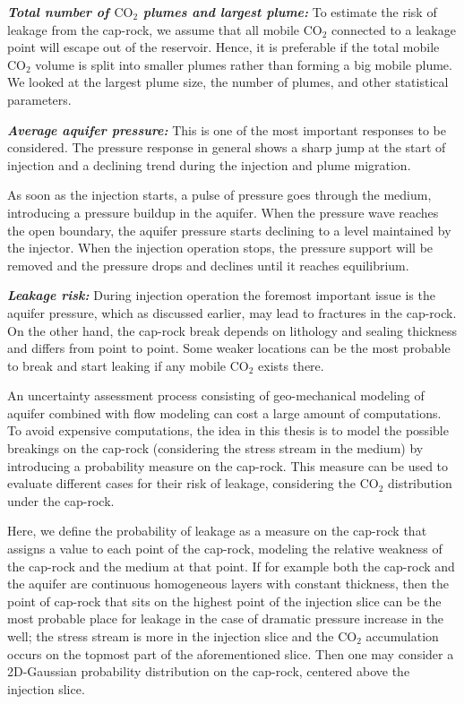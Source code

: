 \textbf{\textit{Total number of $\mbox{CO}_2$ plumes and largest plume:}} To
estimate the risk of leakage from the cap-rock, we assume that all mobile
CO$_2$ connected to a leakage point will escape out of the reservoir. Hence, it
is preferable if the total mobile CO$_2$ volume is split into smaller plumes
rather than forming a big mobile plume. We looked at the largest plume size, the number of
plumes, and other statistical parameters. 

% 

\textbf{\textit{Average aquifer pressure:}} This is one of
the most important responses to be
considered. The pressure response in general shows a sharp jump at the start of
injection and a declining trend during the injection and plume migration.  

As soon as the injection starts, a pulse of pressure goes through the
medium, introducing
a pressure buildup in the aquifer. When the pressure wave reaches the open
boundary, the aquifer pressure starts declining to a level maintained by the
injector. When the injection operation stops, the pressure support will be
removed and the pressure drops and declines until it reaches equilibrium.

\textbf{\textit{Leakage risk:}} During injection operation the foremost
important issue is the aquifer pressure, which as discussed earlier, may lead to fractures in the cap-rock. On the other
hand, the cap-rock break depends on lithology and sealing thickness and differs
from point to point. Some weaker locations can be the most probable to
break and start leaking if any mobile CO$_2$ exists there.

An uncertainty assessment process consisting of geo-mechanical modeling of aquifer combined with flow modeling can cost a large amount of computations. To avoid expensive computations, the idea in this thesis is to model the possible breakings on the cap-rock (considering the stress stream in the medium) by introducing a probability measure on the cap-rock. This measure can be used to
evaluate different cases for their risk of leakage, considering the CO$_2$
distribution under the cap-rock. 

Here, we define the probability of leakage as a measure on the cap-rock that
assigns a value to each point of the cap-rock, modeling the relative weakness of
the cap-rock and the medium at that point. If for example both the cap-rock and
the aquifer are continuous homogeneous layers with constant thickness, then the
point of cap-rock that sits on the highest point of the injection slice can be
the most probable place for leakage in the case of dramatic pressure increase in the
well; the stress stream is more in the injection slice and the CO$_2$
accumulation occurs on the topmost part of the aforementioned slice. Then one may
consider a 2D-Gaussian probability distribution on the cap-rock, centered above
the injection slice.

